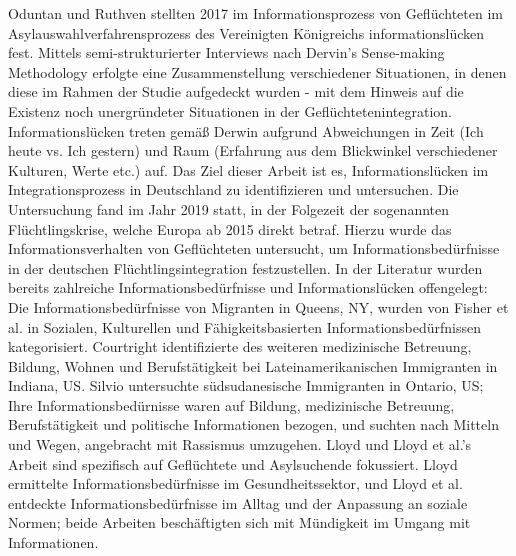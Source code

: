 Oduntan und Ruthven stellten 2017 im Informationsprozess von Gefl\"uchteten im Asylauswahlverfahrensprozess des Vereinigten K\"onigreichs informationsl\"ucken fest. \cite{oduntan2017investigating}
Mittels semi-strukturierter Interviews nach Dervin's Sense-making Methodology\cite{dervin2003sense} erfolgte eine Zusammenstellung verschiedener Situationen, in denen diese im Rahmen der Studie aufgedeckt wurden - mit dem Hinweis auf die Existenz noch unergr\"undeter Situationen in der Gefl\"uchtetenintegration.\newline
Informationsl\"ucken treten gem\"a\ss{} Derwin aufgrund Abweichungen in Zeit (Ich heute vs. Ich gestern) und Raum (Erfahrung aus dem Blickwinkel verschiedener Kulturen, Werte etc.) auf.\cite{dervin2003sense}\newline
Das Ziel dieser Arbeit ist es, Informationslücken im Integrationsprozess in Deutschland zu identifizieren und untersuchen.\newline
Die Untersuchung fand im Jahr 2019 statt, in der Folgezeit der sogenannten Fl\"uchtlingskrise, welche Europa ab 2015 direkt betraf. \cite{unhcr2015seven}\newline
Hierzu wurde das Informationsverhalten von Gefl\"uchteten untersucht, um Informationsbed\"urfnisse in der deutschen Fl\"uchtlingsintegration festzustellen.\newline
In der Literatur wurden bereits zahlreiche Informationsbedürfnisse und Informationslücken offengelegt\cite{oduntan2017investigating}:
Die Informationsbedürfnisse von Migranten in Queens, NY, wurden von Fisher et al. in Sozialen, Kulturellen und Fähigkeitsbasierten Informationsbedürfnissen kategorisiert. \cite{fisher2004information}
Courtright identifizierte des weiteren medizinische Betreuung, Bildung, Wohnen und Berufstätigkeit bei Lateinamerikanischen Immigranten in Indiana, US. \cite{courtright2005health}
Silvio untersuchte südsudanesische Immigranten in Ontario, US; Ihre Informationsbedürnisse waren auf Bildung, medizinische Betreuung, Berufstätigkeit und politische Informationen bezogen, und suchten nach Mitteln und Wegen, angebracht mit Rassismus umzugehen.\cite{hakim2006information}\newline
Lloyd\cite{lloyd2014building} und Lloyd et al.\cite{lloyd2013connecting}'s Arbeit sind spezifisch auf Geflüchtete und Asylsuchende fokussiert. Lloyd ermittelte Informationsbedürfnisse im Gesundheitssektor, und Lloyd et al. entdeckte Informationsbedürfnisse im Alltag und der Anpassung an soziale Normen; beide Arbeiten beschäftigten sich mit Mündigkeit im Umgang mit Informationen.\newline

